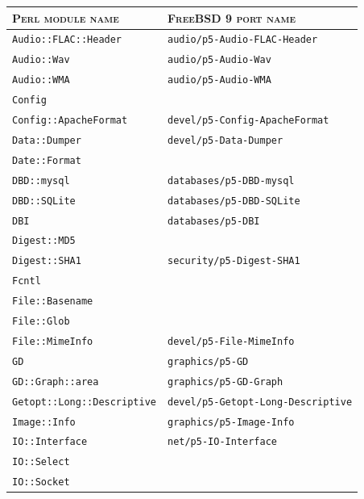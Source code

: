 \documentclass[a4paper,oneside,10pt]{report}
\begin{document}
\begin{table}
	\centering
	\begin{tabular}{|p{15em}|p{18em}|}
		\hline
		\textsc{Perl module name} 						&  \textsc{FreeBSD 9 port name}\\
		\hline
		\hline
		\verb|Audio::FLAC::Header| 						& \verb|audio/p5-Audio-FLAC-Header| \\
		\hline
		\verb|Audio::Wav| 										& \verb|audio/p5-Audio-Wav| \\
		\hline
		\verb|Audio::WMA| 										& \verb|audio/p5-Audio-WMA| \\
		\hline
		\verb|Config| 												& \\
		\hline
		\verb|Config::ApacheFormat|						& \verb|devel/p5-Config-ApacheFormat| \\
		\hline
		\verb|Data::Dumper| 									& \verb|devel/p5-Data-Dumper| \\
		\hline
		\verb|Date::Format| 									&	\\
		\hline
		\verb|DBD::mysql|											& \verb|databases/p5-DBD-mysql| \\
		\hline
		\verb|DBD::SQLite|										& \verb|databases/p5-DBD-SQLite| \\
		\hline
		\verb|DBI|														& \verb|databases/p5-DBI| \\
		\hline
		\verb|Digest::MD5| 										& \\
		\hline
		\verb|Digest::SHA1| 									& \verb|security/p5-Digest-SHA1| \\
		\hline
		\verb|Fcntl| 													& \\
		\hline
		\verb|File::Basename| 								& \\
		\hline
		\verb|File::Glob| 										& \\
		\hline
		\verb|File::MimeInfo| 								& \verb|devel/p5-File-MimeInfo| \\
		\hline
		\verb|GD| 														& \verb|graphics/p5-GD| \\
		\hline
		\verb|GD::Graph::area| 								& \verb|graphics/p5-GD-Graph| \\
		\hline
		\verb|Getopt::Long::Descriptive| 			& \verb|devel/p5-Getopt-Long-Descriptive| \\
		\hline
		\verb|Image::Info| 										& \verb|graphics/p5-Image-Info| \\
		\hline
		\verb|IO::Interface| 									& \verb|net/p5-IO-Interface| \\
		\hline
		\verb|IO::Select| 										& \\
		\hline
		\verb|IO::Socket| 										& \\

\end{tabular}
\end{table}
\end{document}
